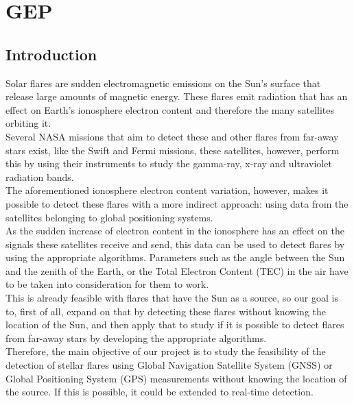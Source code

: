 \chapter{GEP}


\section{Introduction}

Solar flares are sudden electromagnetic emissions on the Sun’s surface that release large amounts of magnetic energy. These flares emit radiation that has an effect on Earth’s ionosphere electron content and therefore the many satellites orbiting it. \cite{hernandez2012gnss}\\

Several NASA missions that aim to detect these and other flares from far-away stars exist, like the Swift and Fermi missions, these satellites, however, perform this by using their instruments to study the gamma-ray, x-ray and ultraviolet radiation bands. \cite{gehrels2013gamma}\\

The aforementioned ionosphere electron content variation, however, makes it possible to detect these flares with a more indirect approach: using data from the satellites belonging to global positioning systems.\\

As the sudden increase of electron content in the ionosphere has an effect on the signals these satellites receive and send, this data can be used to detect flares by using the appropriate algorithms. Parameters such as the angle between the Sun and the zenith of the Earth, or the Total Electron Content (TEC) in the air have to be taken into consideration for them to work. \\

This is already feasible with flares that have the Sun as a source, so our goal is to, first of all, expand on that by detecting these flares without knowing the location of the Sun, and then apply that to study if it is possible to detect flares from far-away stars by developing the appropriate algorithms.\\

Therefore, the main objective of our project is to study the feasibility of the detection of stellar flares using Global Navigation Satellite System (GNSS) or Global Positioning System (GPS) measurements without knowing the location of the source. If this is possible, it could be extended to real-time detection.\\

